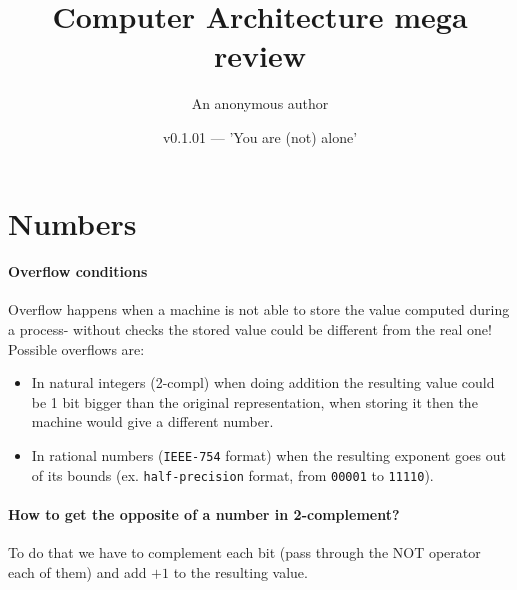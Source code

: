 \documentclass{scrartcl}
\title{Computer Architecture mega review}
\author{An anonymous author}
\date{v0.1.01 — 'You are (not) alone'}
\begin{document}
    \maketitle
    \section{Numbers}
    \paragraph{Overflow conditions}
    Overflow happens when a machine is not able to store the value computed during a process- without checks the stored value could be different from the real one! Possible overflows are:
    \begin{itemize}
        \item In natural integers (2-compl) when doing addition the resulting value could be 1 bit bigger than the original representation, when storing it then the machine would give a different number.
        \item In rational numbers (\texttt{IEEE-754} format) when the resulting exponent goes out of its bounds (ex. \texttt{half-precision} format, from \texttt{00001} to \texttt{11110}).
    \end{itemize}
    \paragraph{How to get the opposite of a number in 2-complement?}
    To do that we have to complement each bit (pass through the NOT operator each of them) and add $+1$ to the resulting value. 
\end{document}
